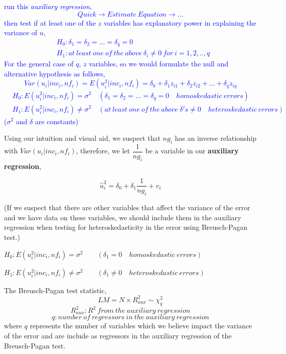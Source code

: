 \documentclass[12pt]{report}
\newenvironment{blueframed}[1][blue]
{\def\FrameCommand{\fboxsep=\FrameSep\fcolorbox{#1}{white}}%
\MakeFramed {\advance\hsize-\width \FrameRestore}}
{\endMakeFramed}
\begin{document}
\justify
\begin{blueframed}
	\vspace{-\baselineskip}
	\justify
	\noindent \textcolor{blue}
	{	\noindent run this \textit{auxiliary regression}, 
		$$Quick \to Estimate\ Equation \to \dots$$
		\noindent then test if at least one of the $z$ variables has explanatory power in explaining the variance of $u$,
		\begin{align*}
		&H_0: \delta_1 = \delta_2 = \dots = \delta_q = 0 \\
		&H_1:at\ least\ one\ of\ the\ above\ \delta_i \neq 0\ for\ i=1,2,..,q
		\end{align*}
		For the general case of $q$, $z$ variables, so we would formulate the null and alternative hypothesis as follows, $$Var(u_i|inc_i,nf_i) = E(u^2_i|inc_i,nf_i) = \delta_0 + \delta_1z_{i1} + \delta_2z_{i2} + \dots + \delta_qz_{iq}$$
		\begin{align*}
		&H_0: E(u^2_i|inc_i,nf_i) = \sigma^2 \quad (\delta_1 = \delta_2 = \dots = \delta_q = 0 \quad homoskedastic\ errors) \\
		&H_1: E(u^2_i|inc_i,nf_i) \neq \sigma^2 \quad (at\ least\ one\ of\ the\ above\ \delta's \neq 0 \quad heteroskedastic\ errors)
		\end{align*} ($\sigma^2$ and $\delta$ are constants)
	}
\end{blueframed}

\noindent Using our intuition and visual aid, we suspect that $ng_i$ has an inverse relationship with $Var(u_i|inc_i,nf_i)$, therefore, we let $\dfrac{1}{ng_i}$ be a variable in our \textbf{auxiliary regression},

$$\hat{u}^2_i = \delta_0 + \delta_1\dfrac{1}{ng_i} + v_i$$

\noindent (If we suspect that there are other variables that affect the variance of the error and we have data on these variables, we should include them in the auxiliary regression when testing for heteroskedasticity in the error using Breusch-Pagan test.)

\noindent $H_0: E(u^2_i|inc_i,nf_i) = \sigma^2 \qquad (\delta_1 = 0 \quad homoskedastic\ errors)$

\noindent $H_1: E(u^2_i|inc_i,nf_i) \neq \sigma^2 \qquad (\delta_1 \neq 0 \quad heteroskedastic\ errors)$

\noindent The Breusch-Pagan test statistic,
$$LM =  N\times R^2_{aux} \sim \chi_{q}^2$$ $$R^2_{aux}: R^2\ from\ the\ auxiliary\ regression$$ $$q:number\ of\ regressors\ in\ the\ auxiliary\ regression$$
\noindent where $q$ represents the number of variables which we believe impact the variance of the error and are include as regressors in the auxiliary regression of the Breusch-Pagan test.
\end{document}
